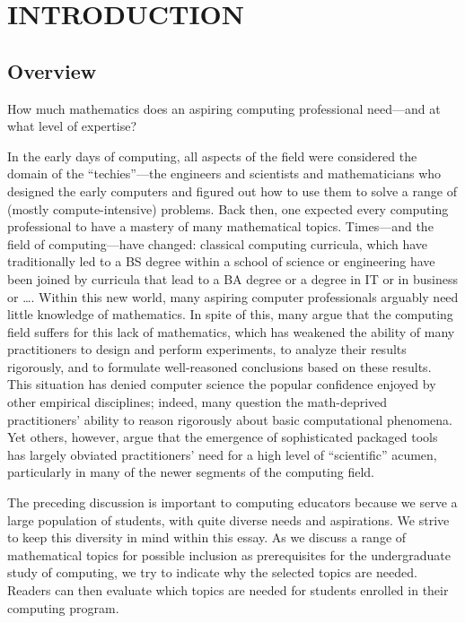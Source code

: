 
\chapter{INTRODUCTION}
\label{ch:intro}



\section{Overview}
\label{sec:overview}

How much mathematics does an aspiring computing professional
need---and at what level of expertise?  

In the early days of computing, all aspects of the field were
considered the domain of the ``techies''---the engineers and
scientists and mathematicians who designed the early computers and
figured out how to use them to solve a range of (mostly
compute-intensive) problems.  Back then, one expected every
computing professional to have a mastery of many mathematical
topics.  Times---and the field of computing---have changed: classical
computing curricula, which have traditionally led to a BS degree
within a school of science or engineering have been joined by
curricula that lead to a BA degree or a degree in IT or in business or
\ldots.  Within this new world, many aspiring computer professionals
arguably need little knowledge of mathematics.  In spite of this, many
argue that the computing field suffers for this lack of mathematics,
which has weakened the ability of many practitioners to design and
perform experiments, to analyze their results rigorously, and to
formulate well-reasoned conclusions based on these results.  This
situation has denied computer science the popular confidence enjoyed
by other empirical disciplines; indeed, many question the
math-deprived practitioners' ability to reason rigorously about basic
computational phenomena.  Yet others, however, argue that the emergence
of sophisticated packaged tools has largely obviated practitioners'
need for a high level of ``scientific'' acumen, particularly in many
of the newer segments of the computing field.

The preceding discussion is important to computing educators because
we serve a large population of students, with quite diverse needs and
aspirations.  We strive to keep this diversity in mind within this
essay.  As we discuss a range of mathematical topics for possible
inclusion as prerequisites for the undergraduate study of computing,
we try to indicate why the selected topics are needed.  Readers can
then evaluate which topics are needed for students enrolled in their
computing program.







